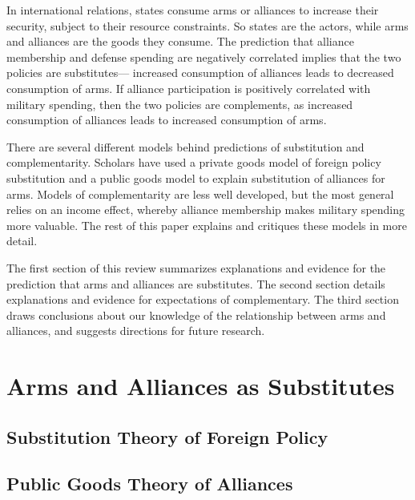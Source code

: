 \documentclass[12pt]{article}
\begin{document}
In international relations, states consume arms or alliances to increase their security, subject to their resource constraints. 
So states are the actors, while arms and alliances are the goods they consume. 
The prediction that alliance membership and defense spending are negatively correlated implies that the two policies are substitutes--- increased consumption of alliances leads to decreased consumption of arms. 
If alliance participation is positively correlated with military spending, then the two policies are complements, as increased consumption of alliances leads to increased consumption of arms. 


There are several different models behind predictions of substitution and complementarity. 
Scholars have used a private goods model of foreign policy substitution and a public goods model to explain substitution of alliances for arms. 
Models of complementarity are less well developed, but the most general relies on an income effect, whereby alliance membership makes military spending more valuable. 
The rest of this paper explains and critiques these models in more detail. 


The first section of this review summarizes explanations and evidence for the prediction that arms and alliances are substitutes. 
The second section details explanations and evidence for expectations of complementary. 
The third section draws conclusions about our knowledge of the relationship between arms and alliances, and suggests directions for future research. 





\section{Arms and Alliances as Substitutes}



\subsection{Substitution Theory of Foreign Policy}




\subsection{Public Goods Theory of Alliances} 
\end{document}
